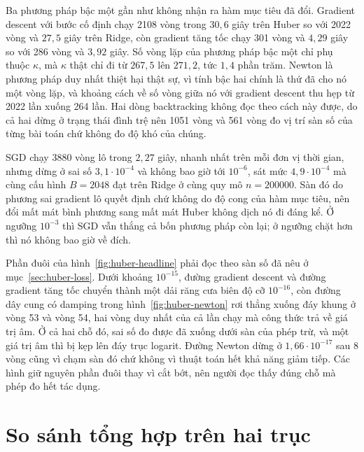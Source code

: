 \documentclass[12pt, a4paper, oneside]{report}
\theoremstyle{definition}
\begin{document}
Ba phương pháp bậc một gần như không nhận ra hàm mục tiêu đã đổi. Gradient descent
với bước cố định chạy 2108 vòng trong $30{,}6$ giây trên Huber so với 2022 vòng và
$27{,}5$ giây trên Ridge, còn gradient tăng tốc chạy 301 vòng và $4{,}29$ giây so
với 286 vòng và $3{,}92$ giây. Số vòng lặp của phương pháp bậc một chỉ phụ thuộc
$\kappa$, mà $\kappa$ thật chỉ đi từ $267{,}5$ lên $271{,}2$, tức $1{,}4$ phần
trăm. Newton là phương pháp duy nhất thiệt hại thật sự, vì tính bậc hai chính là
thứ đã cho nó một vòng lặp, và khoảng cách về số vòng giữa nó với gradient descent
thu hẹp từ 2022 lần xuống 264 lần. Hai dòng backtracking không đọc theo cách này được,
do cả hai dừng ở trạng thái đình trệ nên 1051 vòng và 561 vòng đo vị trí sàn số
của từng bài toán chứ không đo độ khó của chúng.

SGD chạy 3880 vòng lô trong $2{,}27$ giây, nhanh nhất trên mỗi đơn vị thời gian,
nhưng dừng ở sai số $3{,}1 \cdot 10^{-4}$ và không bao giờ tới $10^{-6}$, sát mức
$4{,}9 \cdot 10^{-4}$ mà cùng cấu hình $B = 2048$ đạt trên Ridge ở cùng quy mô
$n = \num{200000}$. Sàn đó do phương sai
gradient lô quyết định chứ không do độ cong của hàm mục tiêu, nên đổi mất mát bình
phương sang mất mát Huber không dịch nó đi đáng kể. Ở ngưỡng $10^{-3}$ thì SGD vẫn
thắng cả bốn phương pháp còn lại; ở ngưỡng chặt hơn thì nó không bao giờ về đích.


Phần đuôi của hình~\ref{fig:huber-headline} phải đọc theo sàn số đã nêu ở
mục~\ref{sec:huber-loss}. Dưới khoảng $10^{-15}$, đường gradient descent và đường
gradient tăng tốc chuyển thành một dải răng cưa biên độ cỡ $10^{-16}$, còn đường
dây cung có damping trong hình~\ref{fig:huber-newton} rơi thẳng xuống đáy khung ở
vòng 53 và vòng 54, hai vòng duy nhất của cả lần chạy mà công thức trả về giá trị
âm. Ở cả hai chỗ đó, sai số đo được đã xuống dưới sàn của phép trừ, và một giá trị
âm thì bị kẹp lên đáy trục logarit.
Đường Newton dừng ở $1{,}66 \cdot 10^{-17}$ sau 8 vòng cũng vì chạm sàn đó chứ
không vì thuật toán hết khả năng giảm tiếp. Các hình giữ nguyên phần đuôi thay vì
cắt bớt, nên người đọc thấy đúng chỗ mà phép đo hết tác dụng.

\chapter{So sánh tổng hợp trên hai trục}\label{ch:headline}
\end{document}
